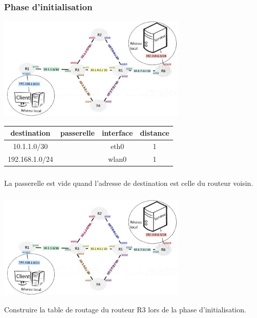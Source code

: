 \documentclass[svgnames,11pt]{beamer}
\begin{document}
\begin{frame}
    \frametitle{Phase d'initialisation}
    \begin{center}
        \centering
        \includegraphics[width=9cm]{ressources/reseau.png}
        \label{reseau}
    \end{center}
\begin{center}
    \begin{tabular}{|*{4}{c|}}
        \hline
        destination    & passerelle & interface & distance \\
        \hline
        10.1.1.0/30    &            & eth0      & 1        \\
        \hline
        192.168.1.0/24 &            & wlan0     & 1        \\
        \hline
    \end{tabular}
\end{center}
\end{frame}

\begin{frame}
    \frametitle{}

    \begin{aretenir}[Remarque]
        La passerelle est vide quand l'adresse de destination est celle du routeur voisin.
    \end{aretenir}

\end{frame}

\begin{frame}
    \frametitle{}
    \begin{center}
        \centering
        \includegraphics[width=9cm]{ressources/reseau.png}
        \label{reseau}
    \end{center}
    \begin{activite}
        Construire la table de routage du routeur R3 lors de la phase d'initialisation.
    \end{activite}

\end{frame}
\end{document}
